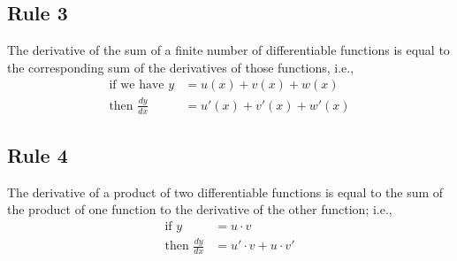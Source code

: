 \documentclass{article}
\begin{document}
\subsection*{Rule 3}
The derivative of the sum of a finite number of differentiable functions is equal to the corresponding sum of the derivatives of those functions, i.e.,
\begin{align*}
\text{if we have } y &= u(x) + v(x) + w(x) \\
\text{then } \frac{dy}{dx} &= u'(x) + v'(x) + w'(x)
\end{align*}

\subsection*{Rule 4}
The derivative of a product of two differentiable functions is equal to the sum of the product of one function to the derivative of the other function; i.e.,
\begin{align*}
\text{if } y &= u \cdot v \\
\text{then } \frac{dy}{dx} &= u' \cdot v + u \cdot v'
\end{align*}
\end{document}
